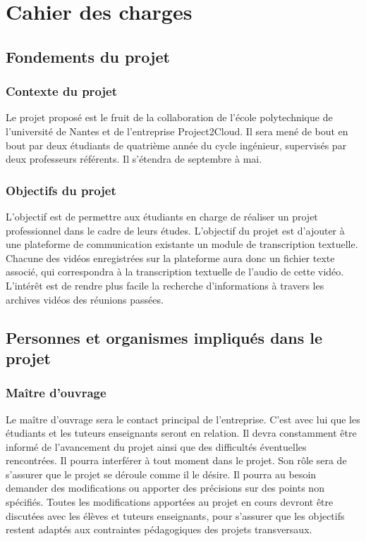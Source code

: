 
	\part{Cahier des charges}
	\parttoc
	
	
	\setcounter{chapter}{0} %
	\setcounter{section}{0} %
	
	\chapter{Fondements du projet}

		\section{Contexte du projet}
		Le projet proposé est le fruit de la collaboration de l'école polytechnique de l'université de Nantes et de l'entreprise Project2Cloud. Il sera mené de bout en bout par deux étudiants de quatrième année du cycle ingénieur, supervisés par deux professeurs référents. Il s'étendra de septembre à mai. 

		\section{Objectifs du projet}
		L'objectif est de permettre aux étudiants en charge de réaliser un projet professionnel dans le cadre de leurs études. L'objectif du projet est d'ajouter à une plateforme de communication existante un module de transcription textuelle. Chacune des vidéos enregistrées sur la plateforme aura donc un fichier texte associé, qui correspondra à la transcription textuelle de l'audio de cette vidéo. L'intérêt est de rendre plus facile la recherche d'informations à travers les archives vidéos des réunions passées. 

	\chapter{Personnes et organismes impliqués dans le projet}
		\section{Maître d'ouvrage}
		Le maître d'ouvrage sera le contact principal de l'entreprise. C'est avec lui que les étudiants et les tuteurs enseignants seront en relation. Il devra constamment être informé de l'avancement du projet ainsi que des difficultés éventuelles rencontrées. Il pourra interférer à tout moment dans le projet. Son rôle sera de s'assurer que le projet se déroule comme il le désire. Il pourra au besoin demander des modifications ou apporter des précisions sur des points non spécifiés. Toutes les modifications apportées au projet en cours devront être discutées avec les élèves et tuteurs enseignants, pour s'assurer que les objectifs restent adaptés aux contraintes pédagogiques des projets transversaux.  

